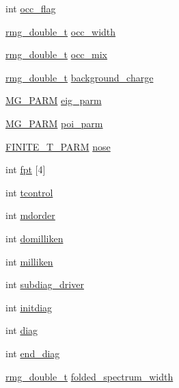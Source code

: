 \begin{DoxyCompactItemize}
int \hyperlink{struct_c_o_n_t_r_o_l_a22ff22bf854a657c4b3c06ecf375b903}{occ\-\_\-flag}
\item 
\hyperlink{rmgtypes_8h_aaa16921c14f121c56eaa42390a340db8}{rmg\-\_\-double\-\_\-t} \hyperlink{struct_c_o_n_t_r_o_l_a094b4573bb13b6174f0bc5dd58b0316d}{occ\-\_\-width}
\item 
\hyperlink{rmgtypes_8h_aaa16921c14f121c56eaa42390a340db8}{rmg\-\_\-double\-\_\-t} \hyperlink{struct_c_o_n_t_r_o_l_a86cbd49d626e3983cd55ef8a275f83d3}{occ\-\_\-mix}
\item 
\hyperlink{rmgtypes_8h_aaa16921c14f121c56eaa42390a340db8}{rmg\-\_\-double\-\_\-t} \hyperlink{struct_c_o_n_t_r_o_l_a80e223dc790449c1b856cb135115bf87}{background\-\_\-charge}
\item 
\hyperlink{struct_m_g___p_a_r_m}{M\-G\-\_\-\-P\-A\-R\-M} \hyperlink{struct_c_o_n_t_r_o_l_ab368a19017233c51ac2742db5eb58bf1}{eig\-\_\-parm}
\item 
\hyperlink{struct_m_g___p_a_r_m}{M\-G\-\_\-\-P\-A\-R\-M} \hyperlink{struct_c_o_n_t_r_o_l_aa6bf352ada81ef732813a1c9d5053750}{poi\-\_\-parm}
\item 
\hyperlink{struct_f_i_n_i_t_e___t___p_a_r_m}{F\-I\-N\-I\-T\-E\-\_\-\-T\-\_\-\-P\-A\-R\-M} \hyperlink{struct_c_o_n_t_r_o_l_a0e8fe07fbdecdf8f61f0131b085742c5}{nose}
\item 
int \hyperlink{struct_c_o_n_t_r_o_l_a7f67bdcbb81645b84c4afc1433ccba40}{fpt} \mbox{[}4\mbox{]}
\item 
int \hyperlink{struct_c_o_n_t_r_o_l_a77625221577c00311db4e5fef081fd55}{tcontrol}
\item 
int \hyperlink{struct_c_o_n_t_r_o_l_a42aa322ac40fecd56d1f239e21b72bf4}{mdorder}
\item 
int \hyperlink{struct_c_o_n_t_r_o_l_a23a0d4702e9287edd2bab65324d058b4}{domilliken}
\item 
int \hyperlink{struct_c_o_n_t_r_o_l_a43f417c3199136e4f33b1444b887ff5b}{milliken}
\item 
int \hyperlink{struct_c_o_n_t_r_o_l_a742397cfa8f65e1e49398825a4dbf94c}{subdiag\-\_\-driver}
\item 
int \hyperlink{struct_c_o_n_t_r_o_l_a21ed7a502a7347e3ed540c758e5da3a2}{initdiag}
\item 
int \hyperlink{struct_c_o_n_t_r_o_l_afc08ba25d7375146bb08ce5068acc615}{diag}
\item 
int \hyperlink{struct_c_o_n_t_r_o_l_af42fe6b46c91403cac41278277ddf978}{end\-\_\-diag}
\item 
\hyperlink{rmgtypes_8h_aaa16921c14f121c56eaa42390a340db8}{rmg\-\_\-double\-\_\-t} \hyperlink{struct_c_o_n_t_r_o_l_accef0bfcc6a470acc9ba151d5a6b8247}{folded\-\_\-spectrum\-\_\-width}

\end{DoxyCompactItemize}
